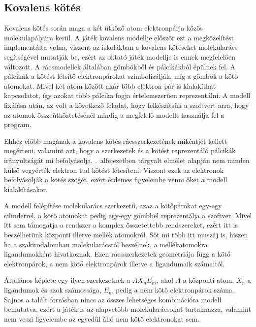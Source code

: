 \documentclass[colorlinks]{thesis-ekf}
\theoremstyle{definition}
\theoremstyle{remark}
\begin{document}
\subsection{Kovalens kötés}
Kovalens kötés során maga a két ütköző atom elektronpárja közös molekulapályára kerül. A játék kovalens modellje először ezt a megközelítést implementálta volna, viszont az iskolákban a kovalens kötéseket molekularács segítségével mutatják be, ezért az oktató játék modellje is ennek megfelelően változott.
A rácsmodellek általában gömbökből és pálcikákból épülnek fel. A pálcikák a kötést létsítő elektronpárokat szimbolizálják, míg a gömbök a kötő atomokat. Mivel két atom között akár több elektron pár is kialakíthat kapcsolatot, így azokat több pálcika fogja értelemszerűen reprezentálni. A modell fixálása után, az volt a következő feladat, hogy felkészítsük a szoftvert arra, hogy az atomok összeütköztetésénél mindig a megfelelő modellt használja fel a program.

Ehhez előbb magának a kovalens kötés rácsszerkezetének mikéntjét kellett megérteni, valamint azt, hogy a szerkezetek és a kötést reprezentáló pálcikák irányultságát mi befolyásolja. .~alfejezetben tárgyalt elmélet alapján nem minden külső vegyérték elektron tud kötést létesíteni. Viszont ezek az elektronok befolyásolják a kötés szögét, ezért érdemes figyelembe venni őket a modell kialakításakor. 

A modell felépítése molekularács szerkezetű, azaz a kötőpárokat egy-egy cilinderrel, a kötő atomokat pedig egy-egy gömbbel reprezentálja a szoftver. Mivel itt sem támogatja a rendszer a komplex összetettebb rendszereket, ezért itt is beszélhetünk központi illetve mellék atomokról. Sőt mi több itt muszáj is, hiszen ha a szakirodalomban molekularácsról beszélnek, a mellékatomokra ligandumokként hivatkoznak. Ezen rácsszerkezetek geometriája függ a kötő elektronpárok, a nem kötő elektronpárok illetve a ligandumaik számaitól. 

Általános képlete egy ilyen szerkezetnek a \begin{math}AX_{n}E_{m}\end{math}, ahol \begin{math}A\end{math} a központi atom, \begin{math}X_{n}\end{math} a ligandumok és azok számossága, \begin{math}E_{m}\end{math} pedig a nem kötő elektronpárok száma. Sajnos a talált forrásban nincs az összes lehetséges kombinációra modell bemutatva, ezért a játék is az alapvetőbb molekularácsokat tartalmazza, valamint nem veszi figyelembe az egyedül álló nem kötő elektronokat sem.\cite{kovalens_modell}
\end{document}
